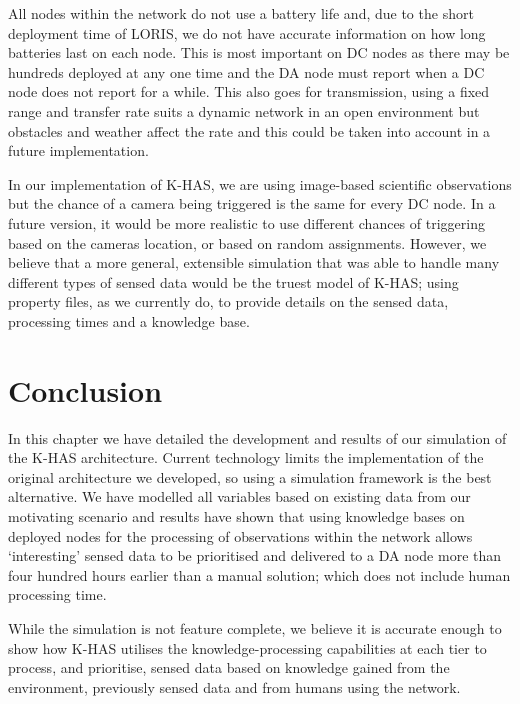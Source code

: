 All nodes within the network do not use a battery life and, due to the short deployment time of LORIS, we do not have accurate information on how long batteries last on each node. This is most important on DC nodes as there may be hundreds deployed at any one time and the DA node must report when a DC node does not report for a while. This also goes for transmission, using a fixed range and transfer rate suits a dynamic network in an open environment but obstacles and weather affect the rate and this could be taken into account in a future implementation.

In our implementation of K-HAS, we are using image-based scientific observations but the chance of a camera being triggered is the same for every DC node. In a future version, it would be more realistic to use different chances of triggering based on the cameras location, or based on random assignments. However, we believe that a more general, extensible simulation that was able to handle many different types of sensed data would be the truest model of K-HAS; using property files, as we currently do, to provide details on the sensed data, processing times and a knowledge base.

\section{Conclusion}
In this chapter we have detailed the development and results of our simulation of the K-HAS architecture. Current technology limits the implementation of the original architecture we developed, so using a simulation framework is the best alternative. We have modelled all variables based on existing data from our motivating scenario and results have shown that using knowledge bases on deployed nodes for the processing of observations within the network allows `interesting' sensed data to be prioritised and delivered to a DA node more than four hundred hours earlier than a manual solution; which does not include human processing time.

While the simulation is not feature complete, we believe it is accurate enough to show how K-HAS utilises the knowledge-processing capabilities at each tier to process, and prioritise, sensed data based on knowledge gained from the environment, previously sensed data and from humans using the network.

